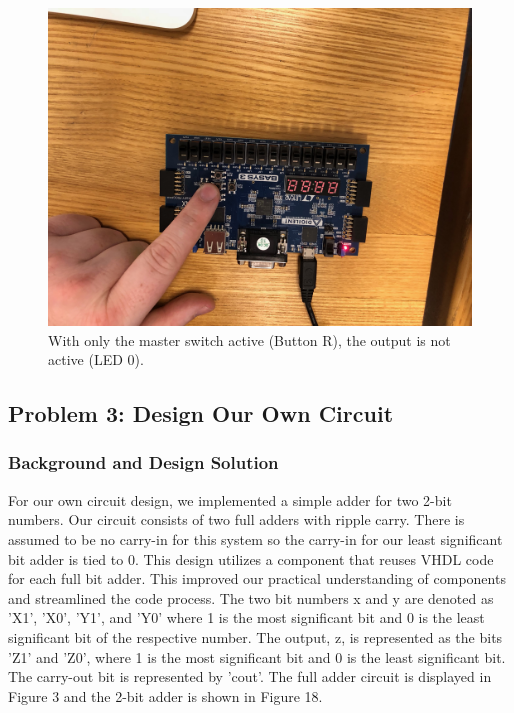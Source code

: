 \documentclass[11pt]{article}
\begin{document}
\begin{figure}[H]
	\includegraphics[width=\textwidth]{report_images/Lab1BoardPictures/Lab1Part2/IMG_0417.jpg}
	\caption{\label{fig:figure-name}With only the master switch active (Button R), the output is not active (LED 0). }
\end{figure}

\subsection{Problem 3: Design Our Own Circuit}

\subsubsection{Background and Design Solution}

For our own circuit design, we implemented a simple adder for two 2-bit numbers. Our circuit consists of two full adders with ripple carry. There is assumed to be no carry-in for this system so the carry-in for our least significant bit adder is tied to 0. This design utilizes a component that reuses VHDL code for each full bit adder. This improved our practical understanding of components and streamlined the code process. The two bit numbers x and y are denoted as 'X1', 'X0', 'Y1', and 'Y0' where 1 is the most significant bit and 0 is the least significant bit of the respective number. The output, z, is represented as the bits 'Z1' and 'Z0', where 1 is the most significant bit and 0 is the least significant bit. The carry-out bit is represented by 'cout'. The full adder circuit is displayed in Figure 3 and the 2-bit adder is shown in Figure 18.
\end{document}
